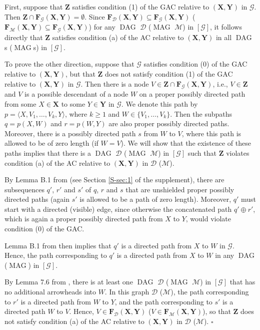 \documentclass[]{article}
\DeclareMathOperator{\DAG}{DAG}
\DeclareMathOperator{\MAG}{MAG}
\theoremstyle{definition}
\newenvironment{prooflemmaeqa}{\noindent{\bf Proof of Lemma \ref{lemmaprovingeqofacconditiona}:}}%
{\hfill $\square$}
\theoremstyle{remark}
\newcommand{\g}[1][G]{\mathcal{#1}}
\newcommand{\fb}[2][X,Y]{\mathbf{F}_{#2}(\mathbf{#1})}%
\begin{document}
\begin{prooflemmaeqa}
   First, suppose that $\mathbf{Z}$ satisfies condition (1) of the GAC relative to $(\mathbf{X},\mathbf{Y})$ in $\g$. Then $\mathbf{Z} \cap \fb{\g} = \emptyset$.
   Since $\fb{\g[D]} \subseteq \fb{\g}$ ($\fb{\g[M]} \subseteq \fb{\g}$) for any $\DAG$ $\g[D]$ ($\MAG$ $\g[M]$) in $[\g]$, it follows directly that $\mathbf{Z}$ satisfies condition (a) of the AC relative to $(\mathbf{X},\mathbf{Y})$ in all $\DAG$s ($\MAG$s) in $[\g]$.

   To prove the other direction, suppose that $\g$ satisfies condition (0) of the GAC relative to $(\mathbf{X},\mathbf{Y})$, but that $\mathbf{Z}$ does not satisfy condition (1) of the GAC relative to $(\mathbf{X,Y})$ in $\g$. Then there is a node $V \in \mathbf{Z} \cap \fb{\g}$, i.e., $V\in \mathbf{Z}$ and $V$ is a possible descendant of a node $W$ on a proper possibly directed path from some $X\in \mathbf{X}$ to some $Y\in \mathbf{Y}$ in $\g$. We denote this path by $p = \langle X, V_1,\dots, V_k, Y \rangle$, where $k\ge 1$ and $W\in \{V_1,\dots,V_k\}$. Then the subpaths $q=p(X,W)$ and $r=p(W,Y)$ are also proper possibly directed paths. Moreover, there is a possibly directed path $s$ from $W$ to $V$, where this path is allowed to be of zero length (if $W=V$). We will show that the existence of these paths implies that there is a $\DAG$ $\g[D]$ ($\MAG$ $\g[M]$) in $[\g]$ such that $\mathbf{Z}$ violates condition (a) of the AC relative to $(\mathbf{X},\mathbf{Y})$ in $\g[D]$ ($\g[M]$).

   By Lemma B.1 from \citet{zhang2008completeness} (see Section \ref{S-sec:1} of the supplement), there are subsequences $q'$, $r'$ and $s'$ of $q$, $r$ and $s$ that are unshielded proper possibly directed paths (again $s'$ is allowed to be a path of zero length). Moreover, $q'$ must start with a directed (visible) edge, since otherwise the concatenated path $q' \oplus r'$, which is again a proper possibly directed path from $X$ to $Y$, would violate condition (0) of the GAC.

 Lemma B.1 from \citet{zhang2008completeness} then implies that $q'$ is a directed path from $X$ to $W$ in $\g$. Hence, the path corresponding to $q'$ is a directed path from $X$ to $W$ in any $\DAG$ ($\MAG$) in $[\g]$.

   By Lemma 7.6 from \citet{maathuis2013generalized}, there is at least one $\DAG$ $\g[D]$ ($\MAG$ $\g[M]$) in  $[\g]$ that has no additional arrowheads into $W$. In this graph $\g[D]$ ($\g[M]$), the path corresponding to $r'$ is a directed path from $W$ to $Y$, and the path corresponding to $s'$ is a directed path $W$ to $V$.
   Hence,  $V \in \fb{\g[D]}$  ($V \in \fb{\g[M]}$), so that $\mathbf{Z}$ does not satisfy condition (a) of the AC relative to $(\mathbf{X},\mathbf{Y})$ in $\g[D]$ ($\g[M]$).
\end{prooflemmaeqa}
\end{document}
